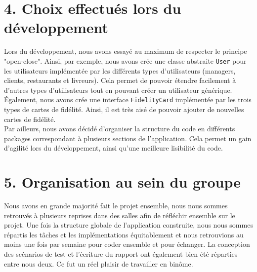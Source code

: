 \section*{4. Choix effectués lors du développement}

Lors du développement, nous avons essayé au maximum de respecter le principe "open-close". Ainsi, par exemple, nous avons crée une classe abstraite \texttt{User} pour les utilisateurs implémentée par les différents types d'utilisateurs (managers, clients, restaurants et livreurs). Cela permet de pouvoir étendre facilement à d'autres types d'utilisateurs tout en pouvant créer un utilisateur générique. Également, nous avons crée une interface \texttt{FidelityCard} implémentée par les trois types de cartes de fidélité. Ainsi, il est très aisé de pouvoir ajouter de nouvelles cartes de fidélité.\\

Par ailleurs, nous avons décidé d'organiser la structure du code en différents packages correspondant à plusieurs sections de l'application. Cela permet un gain d'agilité lors du développement, ainsi qu'une meilleure lisibilité du code.

\section*{5. Organisation au sein du groupe}

Nous avons en grande majorité fait le projet ensemble, nous nous sommes retrouvés à plusieurs reprises dans des salles afin de réfléchir ensemble sur le projet. Une fois la structure globale de l'application construite, nous nous sommes répartis les tâches et les implémentations équitablement et nous retrouvions au moins une fois par semaine pour coder ensemble et pour échanger. La conception des scénarios de test et l'écriture du rapport ont également bien été réparties entre nous deux. Ce fut un réel plaisir de travailler en binôme.